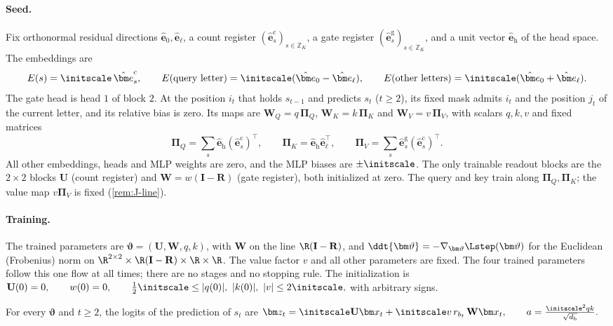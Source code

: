 \paragraph{Seed.} Fix orthonormal residual directions $\hat{\bm e}_0,\hat{\bm e}_\ell$, a count register $(\hat{\bm e}^{\mathrm c}_s)_{s\in\mathbb Z_K}$, a gate register
$(\hat{\bm e}^{\mathrm g}_s)_{s\in\mathbb Z_K}$, and a unit vector $\hat{\bm e}_{\mathrm h}$ of the head space. The embeddings are
\[
 E(s)=\initscale\,\hat{\bm e}^{\mathrm c}_s,\qquad E(\text{query letter})=\initscale(\hat{\bm e}_0-\hat{\bm e}_\ell),\qquad E(\text{other letters})=\initscale(\hat{\bm e}_0+\hat{\bm e}_\ell).
\]
The gate head is head $1$ of block $2$. At the position $i_t$ that holds $s_{t-1}$ and predicts $s_t$ ($t\ge2$), its fixed mask admits
$i_t$ and the position $j_t$ of the current letter, and its relative bias is zero. Its maps are $\mathbf W_Q=q\,\bm\Pi_Q$, $\mathbf W_K=k\,\bm\Pi_K$ and
$\mathbf W_V=v\,\bm\Pi_V$, with scalars $q,k,v$ and fixed matrices
\[
 \bm\Pi_Q=\textstyle\sum_s\hat{\bm e}_{\mathrm h}(\hat{\bm e}^{\mathrm c}_s)^{\!\top},\qquad \bm\Pi_K=\hat{\bm e}_{\mathrm h}\hat{\bm e}_\ell^{\top},\qquad \bm\Pi_V=\sum_s\hat{\bm e}^{\mathrm g}_s(\hat{\bm e}^{\mathrm c}_s)^{\!\top}.
\]
All other embeddings, heads and MLP weights are zero, and the MLP biases are $\pm\initscale$. The only trainable readout blocks are the
$2\times2$ blocks $\mathbf U$ (count register) and $\mathbf W=w(\mathbf I-\mathbf R)$ (gate register), both initialized at zero.
The query and key train along $\bm\Pi_Q,\bm\Pi_K$; the value map $v\bm\Pi_V$ is fixed (\cref{rem:J-line}).

\paragraph{Training.} The trained parameters are $\bm\vartheta=(\mathbf U,\mathbf W,q,k)$, with $\mathbf W$ on the line $\R(\mathbf I-\mathbf R)$, and
$\ddt{\bm\vartheta}=-\nabla_{\bm\vartheta}\Lstep(\bm\vartheta)$ for the Euclidean (Frobenius) norm on $\R^{2\times 2}\times\R(\mathbf I-\mathbf R)\times\R\times\R$. The value factor $v$
and all other parameters are fixed. The four trained parameters follow this one flow at all times; there are no stages and no stopping
rule. The initialization is
 $\mathbf U(0)=0,\qquad w(0)=0,\qquad \tfrac{1}{2}\initscale\le|q(0)|,\ |k(0)|,\ |v|\le2\initscale,$ 
with arbitrary signs.

\begin{lemma}
\label{lem:J-features}
For every $\bm\vartheta$ and $t\ge2$, the logits of the prediction of $s_t$ are
 $\bm z_t=\initscale \mathbf U\bm x_t+\initscale v\,r_{b_t}\,\mathbf W\bm x_t,\qquad a=\frac{\initscale^2qk}{\sqrt{d_{\mathrm h}}}.$ 
\end{lemma}


